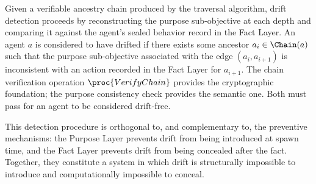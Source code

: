 Given a verifiable ancestry chain produced by the traversal algorithm, drift detection proceeds by reconstructing the purpose sub-objective at each depth and comparing it against the agent's sealed behavior record in the Fact Layer. An agent $a$ is considered to have drifted if there exists some ancestor $a_i \in \Chain(a)$ such that the purpose sub-objective associated with the edge $(a_i, a_{i+1})$ is inconsistent with an action recorded in the Fact Layer for $a_{i+1}$. The chain verification operation $\proc{VerifyChain}$ provides the cryptographic foundation; the purpose consistency check provides the semantic one. Both must pass for an agent to be considered drift-free.

This detection procedure is orthogonal to, and complementary to, the preventive mechanisms: the Purpose Layer prevents drift from being introduced at spawn time, and the Fact Layer prevents drift from being concealed after the fact. Together, they constitute a system in which drift is structurally impossible to introduce and computationally impossible to conceal.

